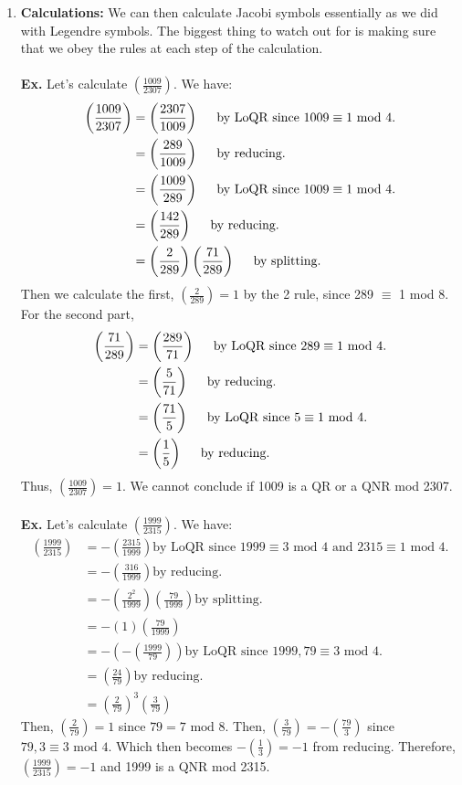 \documentclass[class=article, crop=false]{standalone}
\def\leg#1#2{\left(\frac{#1}{#2}\right)}
\begin{document}
\begin{enumerate}
	\item \textbf{Calculations:}
	We can then calculate Jacobi symbols essentially as we did with Legendre symbols.
	The biggest thing to watch out for is making sure that we obey the rules at each
	step of the calculation.\\\\
	\textbf{Ex.} Let's calculate $\leg{1009}{2307}$. We have:
	\begin{align*}
		\leg{1009}{2307} &= \leg{2307}{1009} \hspace{5mm}\text{by LoQR since }1009\equiv 1\mbox{ mod } 4.\\
		&= \leg{289}{1009} \hspace{5mm}\text{by reducing.}\\
		&= \leg{1009}{289} \hspace{5mm}\text{by LoQR since }1009\equiv 1\mbox{ mod }4.\\
		&= \leg{142}{289} \hspace{5mm}\text{by reducing.}\\
		&=\leg{2}{289}\leg{71}{289} \hspace{5mm}\text{by splitting.}
	\end{align*}
	Then we calculate the first, $\leg{2}{289}=1$ by the 2 rule, since 289 $\equiv$ 1 mod 8.
	For the second part,
	\begin{align*}
		\leg{71}{289} &= \leg{289}{71} \hspace{5mm}\text{by LoQR since }289 \equiv 1\mbox{ mod }4.\\
		&= \leg{5}{71} \hspace{5mm}\text{by reducing.}\\
		&=\leg{71}{5} \hspace{5mm}\text{by LoQR since }5\equiv 1\mbox{ mod }4.\\
		&= \leg{1}{5}\hspace{5mm} \text{by reducing.}
	\end{align*}
	Thus, $\leg{1009}{2307}=1$. We cannot conclude if 1009 is a QR or a QNR mod 2307.\\\\
	\textbf{Ex.} Let's calculate $\leg{1999}{2315}$. We have:
	\begin{align*}
		\leg{1999}{2315} &= -\leg{2315}{1999} \text{by LoQR since }1999\equiv 3\mbox{ mod }4 \text{ and } 2315\equiv 1\mbox{ mod }4.\\
		&= -\leg{316}{1999} \text{by reducing.}\\
		&= -\leg{2^2}{1999} \leg{79}{1999} \text{by splitting.} \\
		&= -(1)\leg{79}{1999} \text{} \\
		&= -\left(-\leg{1999}{79}\right) \text{by LoQR since } 1999,79 \equiv 3\mbox{ mod }4.\\
		&= \leg{24}{79} \text{by reducing.} \\
		&= \leg{2}{79}^3 \leg{3}{79}
	\end{align*}
	Then, $\leg{2}{79}=1$ since $79=7\mbox{ mod }8$. Then, $\leg{3}{79} = -\leg{79}{3}$ since $79,3\equiv 3\mbox{ mod }4$.
	Which then becomes $-\leg{1}{3}=-1$ from reducing. Therefore, $\leg{1999}{2315}=-1$ and 
	1999 is a QNR mod 2315.

\end{enumerate}
\end{document}
